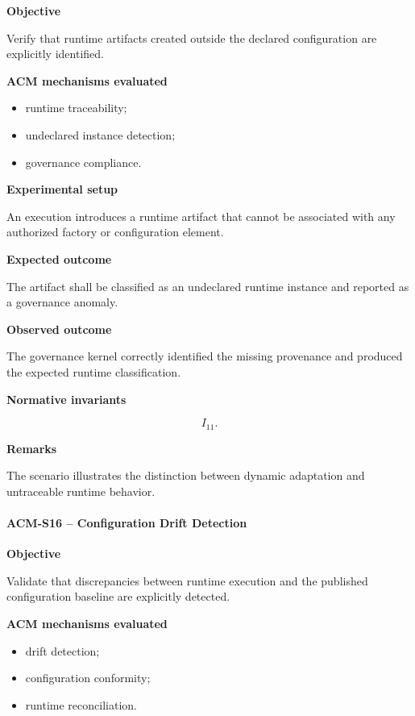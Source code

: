 \documentclass[10pt]{article}
\begin{document}
\textbf{Objective}

Verify that runtime artifacts created outside the declared configuration are
explicitly identified.

\textbf{ACM mechanisms evaluated}

\begin{itemize}
    \item runtime traceability;
    \item undeclared instance detection;
    \item governance compliance.
\end{itemize}

\textbf{Experimental setup}

An execution introduces a runtime artifact that cannot be associated with any
authorized factory or configuration element.

\textbf{Expected outcome}

The artifact shall be classified as an undeclared runtime instance and reported
as a governance anomaly.

\textbf{Observed outcome}

The governance kernel correctly identified the missing provenance and produced
the expected runtime classification.

\textbf{Normative invariants}

\[
I_{11}.
\]

\textbf{Remarks}

The scenario illustrates the distinction between dynamic adaptation and
untraceable runtime behavior.

\paragraph{ACM-S16 -- Configuration Drift Detection}

\textbf{Objective}

Validate that discrepancies between runtime execution and the published
configuration baseline are explicitly detected.

\textbf{ACM mechanisms evaluated}

\begin{itemize}
    \item drift detection;
    \item configuration conformity;
    \item runtime reconciliation.
\end{itemize}
\end{document}
